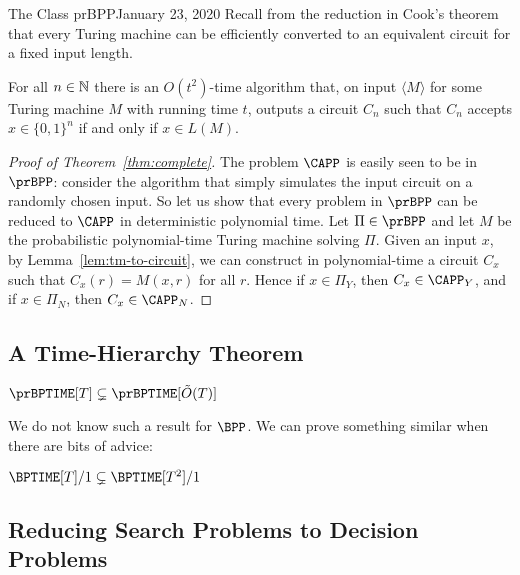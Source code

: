 \begin{lecture}{1}{The Class prBPP}{January 23, 2020}
Recall from the reduction in Cook's theorem that every Turing machine can be
efficiently converted to an equivalent circuit for a fixed input length.
\begin{lemma}\label{lem:tm-to-circuit}
  For all $n \in \mathbb{N}$ there is an $O(t^2)$-time algorithm that, on input
  $\langle M \rangle$ for some Turing machine $M$ with running time $t$, outputs a circuit $C_n$ such
  that $C_n$ accepts $x \in \{0, 1\}^n$ if and only if $x \in L(M)$.
\end{lemma}

\begin{proof}[Proof of Theorem~\ref{thm:complete}]
  The problem $\CAPP$ is easily seen to be in $\prBPP$: consider the algorithm
  that simply simulates the input circuit on a randomly chosen input. So let us
  show that every problem in $\prBPP$ can be reduced to $\CAPP$ in
  deterministic polynomial time. Let $\Pi \in \prBPP$ and let $M$ be the
  probabilistic polynomial-time Turing machine solving $\Pi$. Given an input
  $x$, by Lemma~\ref{lem:tm-to-circuit}, we can construct in polynomial-time a
  circuit $C_x$ such that $C_x(r) = M(x, r)$ for all $r$. Hence if $x \in
  \Pi_Y$, then $C_x \in \CAPP_Y$, and if $x \in \Pi_N$, then $C_x \in \CAPP_N$.
\end{proof}

\subsection{A Time-Hierarchy Theorem}

\begin{theorem}
  $\prBPTIME[T] \subsetneq \prBPTIME[\tilde{O}(T)]$
\end{theorem}


We do not know such a result for $\BPP$. We can prove something similar when there are bits of advice:

\begin{proposition}
	$ \BPTIME[T]/1  \subsetneq \BPTIME[T^2]/1$ 
\end{proposition}



\subsection{Reducing Search Problems to Decision Problems}


\end{lecture}
